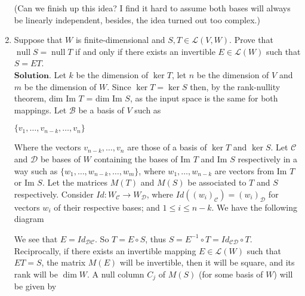 \documentclass{article}
\theoremstyle{remark}
\begin{document}
\begin{enumerate}
        (Can we finish up this idea? I find it hard to assume both bases will always be linearly independent, besides, the idea turned out too complex.)
        \item Suppose that $W$ is finite-dimensional and $S, T \in \mathcal{L}(V, W)$. Prove that $\operatorname{null} S = \operatorname{null} T$ if and only if there exists an invertible $E \in \mathcal{L}(W)$ such that $S = ET$.\\
        $\textbf{Solution.}$ Let $k$ be the dimension of $\ker T$, let $n$ be the dimension of $V$ and $m$ be the dimension of $W$. Since $\ker T = \ker S$ then, by the rank-nullity theorem, dim Im $T$ = dim Im $S$, as the input space is the same for both mappings.
        Let $\mathcal{B}$ be a basis of $V$ such as 
        \begin{center}
            $\{v_1, \dots, v_{n-k}, \dots, v_{n}\}$ 
        \end{center}
        Where the vectors $v_{n-k}, \dots, v_{n}$ are those of a basis of $\ker T$ and $\ker S$.
        Let $\mathcal{C}$ and $\mathcal{D}$ be bases of $W$ containing the bases of Im $T$ and Im $S$ respectively
        in a way such as $\{w_1, \dots, w_{n-k}, \dots, w_m\}$, where $w_1, \dots, w_{n-k}$ are vectors from Im $T$ or Im $S$.
        Let the matrices $M(T)$ and $M(S)$ be associated to $T$ and $S$ respectively.
        Consider $Id: W_{\mathcal{C}} \to W_{\mathcal{D}}$, where $Id((w_i)_{\mathcal{C}}) = (w_i)_{\mathcal{D}}$ for vectors $w_i$ of their respective bases;
        and $1\leq i \leq n-k$.
        We have the following diagram
        \begin{center}
        \end{center}
        We see that $E = Id_{\mathcal{DC}}$. So $T = E\circ S$, thus $S = E^{-1}\circ T = Id_{\mathcal{CD}} \circ T$.
        Reciprocally, if there exists an invertible mapping $E \in \mathcal{L}(W)$ such that $ET = S$, the matrix $M(E)$ will be invertible,
        then it will be square, and its rank will be $\dim W$. A null column $C_j$ of $M(S)$ (for some basis of $W$) will be given by

\end{enumerate}
\end{document}
